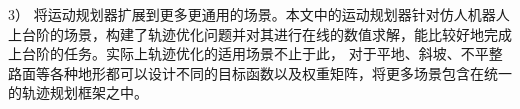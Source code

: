 3） 将运动规划器扩展到更多更通用的场景。本文中的运动规划器针对仿人机器人上台阶的场景，构建了轨迹优化问题并对其进行在线的数值求解，能比较好地完成上台阶的任务。实际上轨迹优化的适用场景不止于此，
对于平地、斜坡、不平整路面等各种地形都可以设计不同的目标函数以及权重矩阵，将更多场景包含在统一的轨迹规划框架之中。





